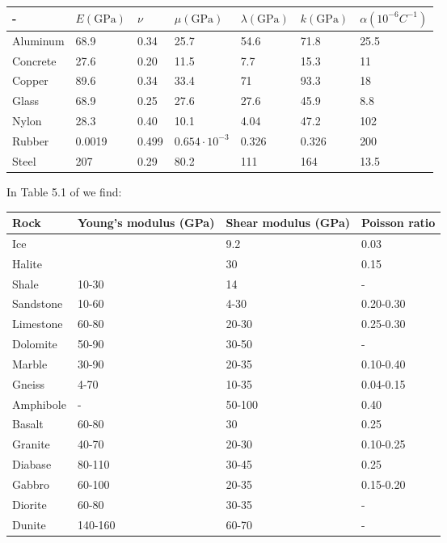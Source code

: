 \begin{center}
\begin{tabular}{lllllll}
\hline
 - & $E(\si{\giga\pascal})$ & $\nu$ & $\mu(\si{\giga\pascal})$ & $\lambda(\si{\giga\pascal})$ & $k(\si{\giga\pascal})$ & $\alpha(10^{-6}C^{-1})$ \\
\hline
Aluminum & 68.9   & 0.34  &25.7                & 54.6  & 71.8  & 25.5 \\
Concrete & 27.6   & 0.20  &11.5                & 7.7   & 15.3  & 11 \\
Copper   & 89.6   & 0.34  &33.4                & 71    & 93.3  & 18 \\
Glass    & 68.9   & 0.25  &27.6                & 27.6  & 45.9  & 8.8 \\
Nylon    & 28.3   & 0.40  &10.1                & 4.04  & 47.2  & 102 \\
Rubber   & 0.0019 & 0.499 &$0.654\cdot10^{-3}$ & 0.326 & 0.326 & 200 \\
Steel    & 207    & 0.29  &80.2                & 111   & 164   & 13.5 \\
\hline
\end{tabular}
\end{center}

In Table 5.1 of \textcite{weijermars} we find:
\begin{center}
\begin{tabular}{llll}
\hline
Rock & Young's modulus (\si{\giga\pascal}) & Shear modulus (\si{\giga\pascal}) & Poisson ratio \\
\hline
Ice & & 9.2 & 0.03 \\
Halite & & 30 & 0.15 \\
Shale & 10-30 & 14 & - \\
Sandstone & 10-60 & 4-30 & 0.20-0.30 \\
Limestone & 60-80 & 20-30 & 0.25-0.30 \\
Dolomite & 50-90 & 30-50 & - \\
Marble & 30-90 & 20-35 & 0.10-0.40 \\
Gneiss & 4-70 & 10-35 & 0.04-0.15 \\
Amphibole & - & 50-100 & 0.40 \\
Basalt & 60-80 & 30 & 0.25 \\
Granite & 40-70 & 20-30 & 0.10-0.25 \\
Diabase & 80-110 & 30-45 & 0.25 \\
Gabbro & 60-100 & 20-35 & 0.15-0.20 \\
Diorite & 60-80 & 30-35 & - \\
Dunite & 140-160 & 60-70 & - \\
\hline
\end{tabular}
\end{center}




